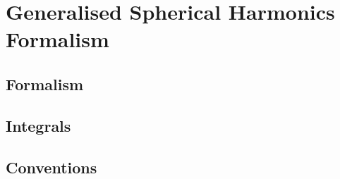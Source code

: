 \chapter{Generalised Spherical Harmonics Formalism}\label{app_gsh}

\section{Formalism}

\section{Integrals}

\section{Conventions}

